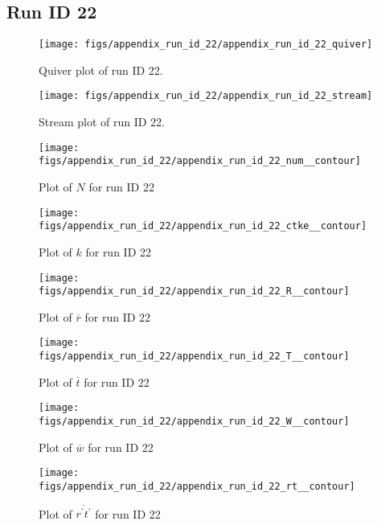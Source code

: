 \subsection{Run ID 22}
\begin{figure}[H]
\centering
\texttt{[image: figs/appendix\_run\_id\_22/appendix\_run\_id\_22\_quiver]}
\caption{Quiver plot of run ID 22.}
\label{fig:appendix_run_id_22_quiver}
\end{figure}


\begin{figure}[H]
\centering
\texttt{[image: figs/appendix\_run\_id\_22/appendix\_run\_id\_22\_stream]}
\caption{Stream plot of run ID 22.}
\label{fig:appendix_run_id_22_stream}
\end{figure}


\begin{figure}[H]
\centering
\texttt{[image: figs/appendix\_run\_id\_22/appendix\_run\_id\_22\_num\_\_contour]}
\caption{Plot of $N$ for run ID 22}
\label{fig:appendix_run_id_22_num__contour}
\end{figure}


\begin{figure}[H]
\centering
\texttt{[image: figs/appendix\_run\_id\_22/appendix\_run\_id\_22\_ctke\_\_contour]}
\caption{Plot of $k$ for run ID 22}
\label{fig:appendix_run_id_22_ctke__contour}
\end{figure}


\begin{figure}[H]
\centering
\texttt{[image: figs/appendix\_run\_id\_22/appendix\_run\_id\_22\_R\_\_contour]}
\caption{Plot of $\overline{r}$ for run ID 22}
\label{fig:appendix_run_id_22_R__contour}
\end{figure}


\begin{figure}[H]
\centering
\texttt{[image: figs/appendix\_run\_id\_22/appendix\_run\_id\_22\_T\_\_contour]}
\caption{Plot of $\overline{t}$ for run ID 22}
\label{fig:appendix_run_id_22_T__contour}
\end{figure}


\begin{figure}[H]
\centering
\texttt{[image: figs/appendix\_run\_id\_22/appendix\_run\_id\_22\_W\_\_contour]}
\caption{Plot of $\overline{w}$ for run ID 22}
\label{fig:appendix_run_id_22_W__contour}
\end{figure}


\begin{figure}[H]
\centering
\texttt{[image: figs/appendix\_run\_id\_22/appendix\_run\_id\_22\_rt\_\_contour]}
\caption{Plot of $\overline{r^\prime t^\prime}$ for run ID 22}
\label{fig:appendix_run_id_22_rt__contour}
\end{figure}


